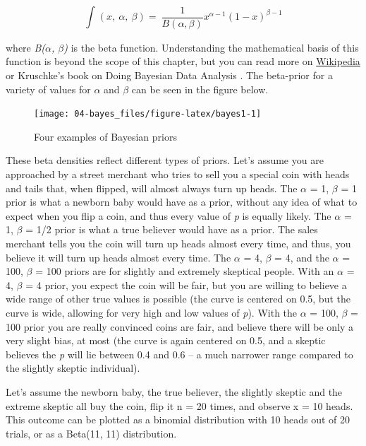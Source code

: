 \documentclass[
]{krantz}
\begin{document}
\[
\int_{}^{}{\left( x,\ \alpha,\ \beta \right) = \ \frac{1}{B(\alpha,\beta)}}x^{\alpha - 1}{(1 - x)}^{\beta - 1}
\]

where \emph{B(\(\alpha\), \(\beta\))} is the beta function. Understanding the mathematical basis of this function is beyond the scope of this chapter, but you can read more on \href{https://en.wikipedia.org/wiki/Beta_distribution}{Wikipedia} or Kruschke's book on Doing Bayesian Data Analysis \citep{kruschke_doing_2014}. The beta-prior for a variety of values for \(\alpha\) and \(\beta\) can be seen in the figure below.

\begin{figure}

{\centering \texttt{[image: 04-bayes\_files/figure-latex/bayes1-1]} 

}

\caption{Four examples of Bayesian priors}\label{fig:bayes1}
\end{figure}

These beta densities reflect different types of priors. Let's assume you are approached by a street merchant who tries to sell you a special coin with heads and tails that, when flipped, will almost always turn up heads. The \(\alpha\) = 1, \(\beta\) = 1 prior is what a newborn baby would have as a prior, without any idea of what to expect when you flip a coin, and thus every value of \emph{p} is equally likely. The \(\alpha\) = 1, \(\beta\) = 1/2 prior is what a true believer would have as a prior. The sales merchant tells you the coin will turn up heads almost every time, and thus, you believe it will turn up heads almost every time. The \(\alpha\) = 4, \(\beta\) = 4, and the \(\alpha\) = 100, \(\beta\) = 100 priors are for slightly and extremely skeptical people. With an \(\alpha\) = 4, \(\beta\) = 4 prior, you expect the coin will be fair, but you are willing to believe a wide range of other true values is possible (the curve is centered on 0.5, but the curve is wide, allowing for very high and low values of \emph{p}). With the \(\alpha\) = 100, \(\beta\) = 100 prior you are really convinced coins are fair, and believe there will be only a very slight bias, at most (the curve is again centered on 0.5, and a skeptic believes the \emph{p} will lie between 0.4 and 0.6 -- a much narrower range compared to the slightly skeptic individual).

Let's assume the newborn baby, the true believer, the slightly skeptic and the extreme skeptic all buy the coin, flip it n = 20 times, and observe x = 10 heads. This outcome can be plotted as a binomial distribution with 10 heads out of 20 trials, or as a Beta(11, 11) distribution.
\end{document}
